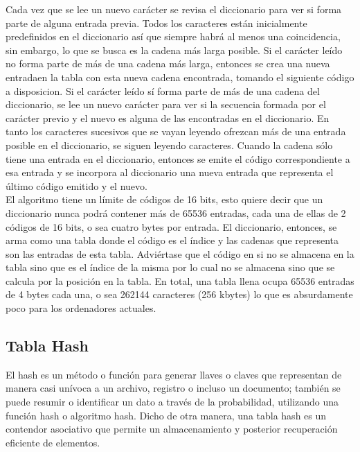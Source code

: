 \documentclass[letterpaper]{article}
\begin{document}
Cada vez que se lee un nuevo carácter se revisa el diccionario para ver si forma parte de alguna entrada previa. Todos los caracteres están inicialmente predefinidos en el diccionario así que siempre habrá al menos una coincidencia, sin embargo, lo que se busca es la cadena más larga posible. Si el carácter leído no forma parte de más de una cadena más larga, entonces se crea una nueva entradaen la tabla con esta nueva cadena encontrada, tomando el siguiente código a disposicion. Si el carácter leído sí forma parte de más de una cadena del diccionario, se lee un nuevo carácter para ver si la secuencia formada por el carácter previo y el nuevo es alguna de las encontradas en el diccionario. En tanto los caracteres sucesivos que se vayan leyendo ofrezcan más de una entrada posible en el diccionario, se siguen leyendo caracteres. Cuando la cadena sólo tiene una entrada en el diccionario, entonces se emite el código correspondiente a esa entrada y se incorpora al diccionario una nueva entrada que representa el último código emitido y el nuevo.\\

El algoritmo tiene un límite de códigos de 16 bits, esto quiere decir que un diccionario nunca podrá contener más de 65536 entradas, cada una de ellas de 2 códigos de 16 bits, o sea cuatro bytes por entrada. El diccionario, entonces, se arma como una tabla donde el código es el índice y las cadenas que representa son las entradas de esta tabla. Adviértase que el código en si no se almacena en la tabla sino que es el índice de la misma por lo cual no se almacena sino que se calcula por la posición en la tabla. En total, una tabla llena ocupa 65536 entradas de 4 bytes cada una, o sea 262144 caracteres (256 kbytes) lo que es absurdamente poco para los ordenadores actuales.\\

\subsection{Tabla Hash}

El hash es un método o función para generar llaves o claves que representan de manera casi unívoca a un archivo, registro o incluso un documento; también se puede resumir o identificar un dato a través de la probabilidad, utilizando una función hash o algoritmo hash. Dicho de otra manera, una tabla hash es un contendor asociativo que permite un almacenamiento y posterior recuperación eficiente de elementos.\\
\end{document}

